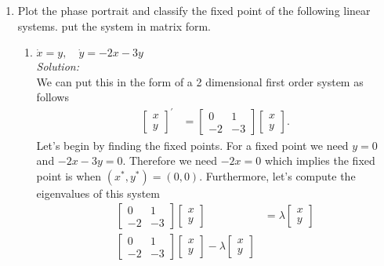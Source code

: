\documentclass[10pt]{amsart}
\theoremstyle{nonumberplain}
\begin{document}
\begin{enumerate}[label={\bf {\arabic*}:}]
\begin{enumerate}
\end{enumerate}

\newpage

\item Plot the phase portrait and classify the fixed point of the following linear systems. 
put the system in matrix form. \\

\begin{enumerate}

\item $\dot x = y, \quad \dot y = -2x - 3y$ \\
\textit{Solution:} \\
We can put this in the form of a 2 dimensional first order system as follows
\begin{align*}
\begin{bmatrix}
x \\ y
\end{bmatrix}^\prime
&= \begin{bmatrix}
0 & 1 \\
-2 & -3
\end{bmatrix} \begin{bmatrix}
x \\ y
\end{bmatrix}.
\end{align*}
Let's begin by finding the fixed points.
For a fixed point we need $y = 0$ and $-2x -3y = 0$.
Therefore we need $-2x = 0$ which implies the fixed point is when $(x^*,y^*) = (0, 0)$.
Furthermore, let's compute the eigenvalues of this system
\begin{align*}
\begin{bmatrix} 0 & 1 \\ -2 & -3 \end{bmatrix}
\begin{bmatrix} x \\ y \end{bmatrix}
	&= \lambda \begin{bmatrix} x \\ y \end{bmatrix} \\
\begin{bmatrix} 0 & 1 \\ -2 & -3 \end{bmatrix}
\begin{bmatrix} x \\ y \end{bmatrix} - \lambda \begin{bmatrix} x \\ y \end{bmatrix}

\end{align*}
\end{enumerate}
\end{enumerate}
\end{document}
